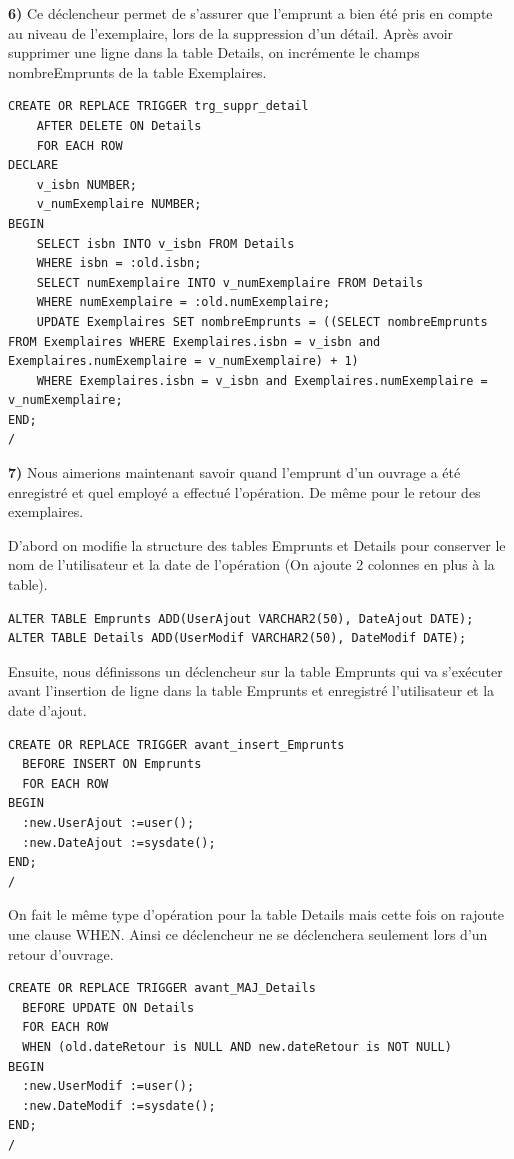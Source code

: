 \documentclass[a4paper,12pt]{article}
\begin{document}
\textbf {6)} Ce déclencheur permet de s'assurer que l’emprunt a bien été pris en compte au niveau de l’exemplaire, lors de la suppression d'un détail. Après avoir supprimer une ligne dans la table Details, on incrémente le champs nombreEmprunts de la table Exemplaires.

\begin{lstlisting}
CREATE OR REPLACE TRIGGER trg_suppr_detail
	AFTER DELETE ON Details
	FOR EACH ROW
DECLARE
	v_isbn NUMBER;
	v_numExemplaire NUMBER;
BEGIN
	SELECT isbn INTO v_isbn FROM Details 
	WHERE isbn = :old.isbn;
	SELECT numExemplaire INTO v_numExemplaire FROM Details
	WHERE numExemplaire = :old.numExemplaire;
	UPDATE Exemplaires SET nombreEmprunts = ((SELECT nombreEmprunts FROM Exemplaires WHERE Exemplaires.isbn = v_isbn and Exemplaires.numExemplaire = v_numExemplaire) + 1) 
	WHERE Exemplaires.isbn = v_isbn and Exemplaires.numExemplaire = v_numExemplaire;
END;
/
\end{lstlisting}

\textbf {7)} Nous aimerions maintenant savoir quand l’emprunt d’un ouvrage a été enregistré et quel employé a effectué l’opération. De même pour le retour des exemplaires. 

D'abord on modifie la structure des tables Emprunts et Details pour conserver le nom de l'utilisateur et la date de l'opération (On ajoute 2 colonnes en plus à la table).

\begin{lstlisting}
ALTER TABLE Emprunts ADD(UserAjout VARCHAR2(50), DateAjout DATE);
ALTER TABLE Details ADD(UserModif VARCHAR2(50), DateModif DATE);
\end{lstlisting}

\clearpage
Ensuite, nous définissons un déclencheur sur la table Emprunts qui va s'exécuter avant l'insertion de ligne dans la table Emprunts et enregistré l'utilisateur et la date d'ajout.

\begin{lstlisting}
CREATE OR REPLACE TRIGGER avant_insert_Emprunts 
  BEFORE INSERT ON Emprunts
  FOR EACH ROW
BEGIN
  :new.UserAjout :=user();
  :new.DateAjout :=sysdate();
END;
/
\end{lstlisting}

On fait le même type d'opération pour la table Details mais cette fois on rajoute une clause WHEN. Ainsi ce déclencheur ne se déclenchera seulement lors d'un retour d'ouvrage.

\begin{lstlisting}
CREATE OR REPLACE TRIGGER avant_MAJ_Details
  BEFORE UPDATE ON Details
  FOR EACH ROW
  WHEN (old.dateRetour is NULL AND new.dateRetour is NOT NULL)
BEGIN
  :new.UserModif :=user();
  :new.DateModif :=sysdate();
END;
/
\end{lstlisting}
\end{document}

